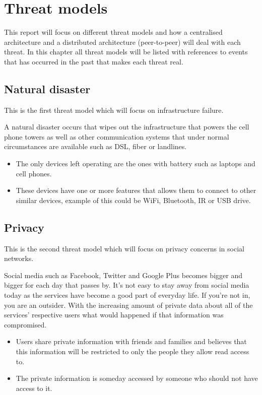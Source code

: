 \section{Threat models}
This report will focus on different threat models and how a centralised architecture and a distributed architecture (peer-to-peer) will deal with each threat.
In this chapter all threat models will be listed with references to events that has occurred in the past that makes each threat real.

\subsection{Natural disaster}
This is the first threat model which will focus on infrastructure failure.

A natural disaster occurs that wipes out the infrastructure that powers the cell phone towers as well as other communication systems that under normal circumstances are available such as DSL, fiber or landlines.
\begin{itemize}
  \item The only devices left operating are the ones with battery such as laptops and cell phones.
  \item These devices have one or more features that allows them to connect to other similar devices, example of this could be WiFi, Bluetooth, IR or USB drive.
\end{itemize}

\subsection{Privacy}
This is the second threat model which will focus on privacy concerns in social networks.

Social media such as Facebook, Twitter and Google Plus becomes bigger and bigger for each day that passes by.
It's not easy to stay away from social media today as the services have become a good part of everyday life.
If you're not in, you are an outsider. 
With the increasing amount of private data about all of the services' respective users what would happened if that information was compromised.

\begin{itemize}
  \item Users share private information with friends and families and believes that this information will be restricted to only the people they allow read access to.
  \item The private information is someday accessed by someone who should not have access to it. 
\end{itemize}

